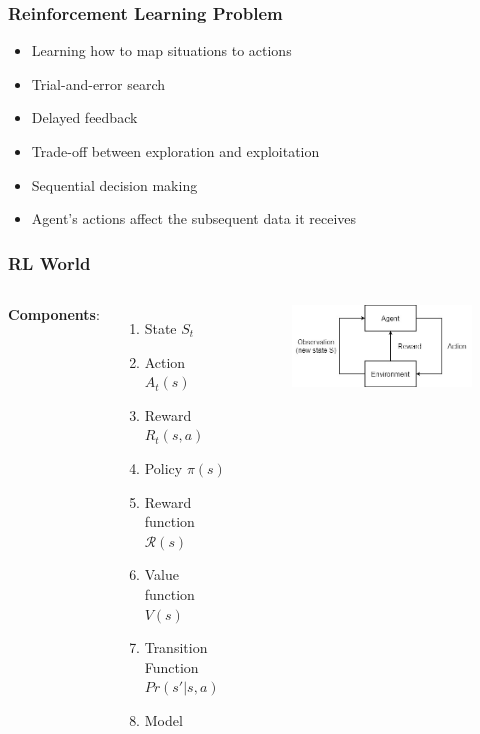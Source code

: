 \documentclass{beamer}
\begin{document}
\begin{frame}
\frametitle{Reinforcement Learning Problem}
\begin{itemize}
	\item Learning how to map situations to actions 
	\item Trial-and-error search
	\item Delayed feedback
	\item Trade-off between exploration and exploitation
	\item Sequential decision making
	\item Agent's actions affect the subsequent data it receives
\end{itemize}
\end{frame}

\begin{frame}
\frametitle{RL World}
\begin{columns}[c] %
	
	\textbf{Components}:
	\begin{enumerate}
		\item State $S_t$
		\item Action $A_t(s)$
		\item Reward $R_t(s,a)$

		\item Policy $\pi(s)$
		\item Reward function $\mathcal{R}(s)$
		\item Value function $V(s)$

		\item Transition Function $Pr(s'|s,a)$
		\item Model

	\end{enumerate} 
	
	\begin{figure}
		\includegraphics[scale=0.45]{rlw}
	\end{figure}
	
\end{columns}
\end{frame}
\end{document}
